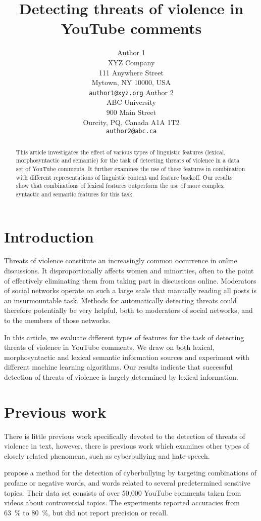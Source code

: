 \documentclass[11pt,letterpaper]{article}
\title{Detecting threats of violence in YouTube comments}
\author{Author 1\\
	    XYZ Company\\
	    111 Anywhere Street\\
	    Mytown, NY 10000, USA\\
	    {\tt author1@xyz.org}
	  \And
	Author 2\\
  	ABC University\\
  	900 Main Street\\
  	Ourcity, PQ, Canada A1A 1T2\\
  {\tt author2@abc.ca}}
\date{}
\begin{document}
\maketitle

\begin{abstract}
This article investigates the effect of various types of linguistic
features (lexical, morphosyntactic and semantic) for the task of
detecting threats of violence in a data set of YouTube comments. It
further examines the use of these features in combination with
different representations of linguistic context and feature backoff. Our results show that combinations of lexical features outperform the use of more complex syntactic and semantic features for this task.
\end{abstract}

\section{Introduction}
\label{sec:intro}
Threats of violence constitute an increasingly common occurrence in online
discussions. It disproportionally affects women and minorities, often
to the point of effectively eliminating them from taking part in
discussions online. Moderators of social networks operate on such a
large scale that manually reading all posts is an insurmountable
task. Methods for automatically detecting threats could therefore
potentially be very helpful, both to moderators of social networks,
and to the members of those networks.

In this article, we evaluate different types of features for the task
of detecting threats of violence in YouTube comments. We draw on both
lexical, morphosyntactic and lexical semantic information sources and
experiment with different machine learning algorithms. Our results
indicate that successful detection of threats of violence is largely
determined by lexical information.

\section{Previous work}
\label{sec:prev}
There is little previous work specifically devoted to the detection of
threats of violence in text, however, there is previous work which
examines other types of closely related phenomena, such as
cyberbullying and hate-speech.

 propose a method for the detection of
cyberbullying by targeting combinations of profane or negative words,
and words related to several predetermined sensitive topics. Their
data set consists of over 50,000 YouTube comments taken from videos
about controversial topics. %
The experiments reported accuracies from 63~\% to 80~\%, but did not
report precision or recall.
\end{document}
